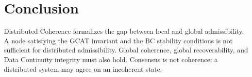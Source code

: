 \documentclass[letterpaper,10pt,conference]{ieeeconf}
\begin{document}
\section{Conclusion}

Distributed Coherence formalizes the gap between local and global admissibility. A node satisfying the GCAT invariant and the BC stability conditions is not sufficient for distributed admissibility. Global coherence, global recoverability, and Data Continuity integrity must also hold. Consensus is not coherence: a distributed system may agree on an incoherent state.
\end{document}
